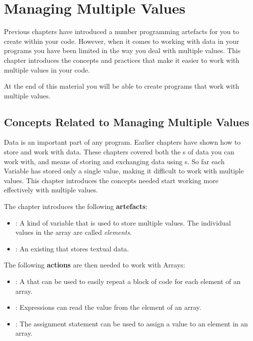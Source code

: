 \chapter{Managing Multiple Values} %
\label{cha:managing_multiple_values}

Previous chapters have introduced a number programming artefacts for you to create within your code. However, when it comes to working with data in your programs you have been limited in the way you deal with multiple values. This chapter introduces the concepts and practices that make it easier to work with multiple values in your code.

At the end of this material you will be able to create programs that work with multiple values. 

\minitoc

\clearpage
\section{Concepts Related to Managing Multiple Values} %
\label{sec:managing_multiple_values_concepts}

Data is an important part of any program. Earlier chapters have shown how to store and work with data. These chapters covered both the s of data you can work with, and means of storing and exchanging data using s. So far each Variable has stored only a single value, making it difficult to work with multiple values. This chapter introduces the concepts needed start working more effectively with multiple values.

The chapter introduces the following \textbf{artefacts}:
\begin{itemize}
  \item {}: A kind of variable that is used to store multiple values. The individual values in the array are called \emph{elements}.
  \item {}: An existing  that stores textual data.
\end{itemize}

The following \textbf{actions} are then needed to work with Arrays:
\begin{itemize}
  \item {}: A  that can be used to easily repeat a block of code for each element of an array.
  \item {}: Expressions can read the value from the element of an array.
  \item {}: The assignment statement can be used to assign a value to an element in an array.
\end{itemize}

